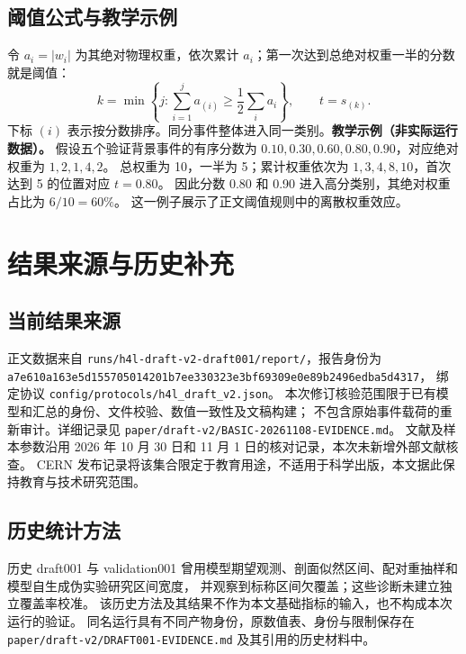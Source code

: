 \documentclass[11pt,a4paper,fontset=fandol,scheme=plain]{ctexart}
\begin{document}
\subsection{阈值公式与教学示例}
\label{app:threshold}
令 $a_i=|w_i|$ 为其绝对物理权重，依次累计 $a_i$；第一次达到总绝对权重一半的分数就是阈值：
\[
 k=\min\left\{j:\sum_{i=1}^{j}a_{(i)}\geq\frac12\sum_i a_i\right\},
 \qquad t=s_{(k)}.
\]
下标 $(i)$ 表示按分数排序。同分事件整体进入同一类别。\textbf{教学示例（非实际运行数据）。} 假设五个验证背景事件的有序分数为
$0.10,0.30,0.60,0.80,0.90$，对应绝对权重为 $1,2,1,4,2$。
总权重为 10，一半为 5；累计权重依次为 $1,3,4,8,10$，首次达到 5 的位置对应 $t=0.80$。
因此分数 0.80 和 0.90 进入高分类别，其绝对权重占比为 $6/10=60\%$。
这一例子展示了正文阈值规则中的离散权重效应。
\FloatBarrier

\section{结果来源与历史补充}\label{app:provenance}

\subsection{当前结果来源}
正文数据来自 \nolinkurl{runs/h4l-draft-v2-draft001/report/}，报告身份为
\nolinkurl{a7e610a163e5d155705014201b7ee330323e3bf69309e0e89b2496edba5d4317}，
绑定协议 \nolinkurl{config/protocols/h4l_draft_v2.json}。
本次修订核验范围限于已有模型和汇总的身份、文件校验、数值一致性及文稿构建；
不包含原始事件载荷的重新审计。详细记录见 \nolinkurl{paper/draft-v2/BASIC-20261108-EVIDENCE.md}。
文献及样本参数沿用 2026 年 10 月 30 日和 11 月 1 日的核对记录，本次未新增外部文献核查。
CERN 发布记录将该集合限定于教育用途，不适用于科学出版，本文据此保持教育与技术研究范围。

\subsection{历史统计方法}\label{app:interval}
历史 draft001 与 validation001 曾用模型期望观测、剖面似然区间、配对重抽样和模型自生成伪实验研究区间宽度，
并观察到标称区间欠覆盖；这些诊断未建立独立覆盖率校准。
该历史方法及其结果不作为本文基础指标的输入，也不构成本次运行的验证。
同名运行具有不同产物身份，原数值表、身份与限制保存在
\nolinkurl{paper/draft-v2/DRAFT001-EVIDENCE.md} 及其引用的历史材料中。
\end{document}
